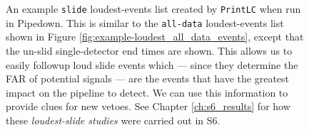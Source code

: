 \begin{figure}[p]
\label{fig:example-loudest_slide_events}
\center
{}
\caption{An example \texttt{slide} loudest-events list created by
\texttt{PrintLC} when run in Pipedown. This is similar to the \texttt{all-data}
loudest-events list shown in Figure \ref{fig:example-loudest_all_data_events},
except that the un-slid single-detector end times are shown. This allows us to
easily followup loud slide events which --- since they determine the \ac{FAR}
of potential signals --- are the events that have the greatest impact on the
pipeline to detect. We can use this information to provide clues for new
vetoes. See Chapter \ref{ch:s6_results} for how these \emph{loudest-slide
studies} were carried out in S6.}
\end{figure}

